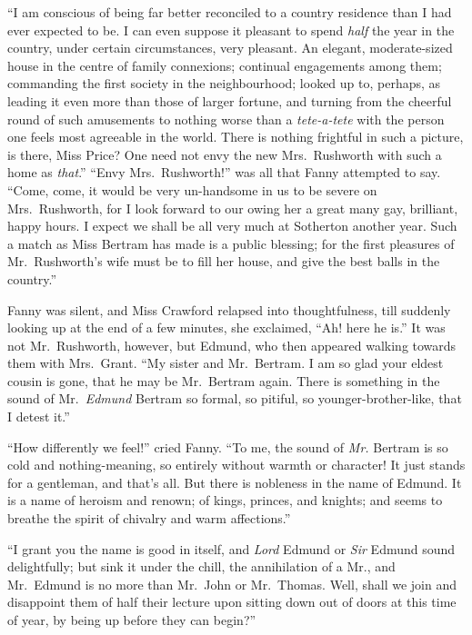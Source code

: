 \documentclass{article}
\begin{document}
``I am conscious of being far better reconciled to a country
residence than I had ever expected to be.  I can even
suppose it pleasant to spend \emph{half} the year in the country,
under certain circumstances, very pleasant.  An elegant,
moderate-sized house in the centre of family connexions;
continual engagements among them; commanding the first society
in the neighbourhood; looked up to, perhaps, as leading
it even more than those of larger fortune, and turning
from the cheerful round of such amusements to nothing
worse than a \emph{tete-a-tete} with the person one feels
most agreeable in the world.  There is nothing frightful
in such a picture, is there, Miss Price?  One need not
envy the new Mrs.\ Rushworth with such a home as \emph{that}.''
``Envy Mrs.\ Rushworth!'' was all that Fanny attempted to say.
``Come, come, it would be very un-handsome in us to be
severe on Mrs.\ Rushworth, for I look forward to our owing
her a great many gay, brilliant, happy hours.  I expect
we shall be all very much at Sotherton another year.
Such a match as Miss Bertram has made is a public blessing;
for the first pleasures of Mr.\ Rushworth's wife must be to
fill her house, and give the best balls in the country.''

Fanny was silent, and Miss Crawford relapsed into
thoughtfulness, till suddenly looking up at the end
of a few minutes, she exclaimed, ``Ah! here he is.''
It was not Mr.\ Rushworth, however, but Edmund,
who then appeared walking towards them with Mrs.\ Grant.
``My sister and Mr.\ Bertram.  I am so glad your eldest
cousin is gone, that he may be Mr.\ Bertram again.  There is
something in the sound of Mr.\ \emph{Edmund} Bertram so formal,
so pitiful, so younger-brother-like, that I detest it.''

``How differently we feel!'' cried Fanny.  ``To me,
the sound of \emph{Mr.} Bertram is so cold and nothing-meaning,
so entirely without warmth or character!  It just stands
for a gentleman, and that's all.  But there is nobleness
in the name of Edmund.  It is a name of heroism and renown;
of kings, princes, and knights; and seems to breathe
the spirit of chivalry and warm affections.''

``I grant you the name is good in itself, and \emph{Lord} Edmund
or \emph{Sir} Edmund sound delightfully; but sink it under the chill,
the annihilation of a Mr., and Mr.\ Edmund is no more than
Mr.\ John or Mr.\ Thomas.  Well, shall we join and disappoint
them of half their lecture upon sitting down out of doors
at this time of year, by being up before they can begin?''
\end{document}
